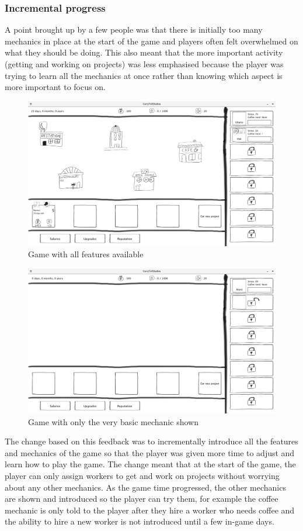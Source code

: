 \documentclass[11pt]{article}
\begin{document}
\subsubsection{Incremental progress}
A point brought up by a few people was that there is initially too many mechanics in place at the start of the game and players often felt overwhelmed on what they should be doing. This also meant that the more important activity (getting and working on projects) was less emphasised because the player was trying to learn all the mechanics at once rather than knowing which aspect is more important to focus on.
\begin{figure}[H]
\centering
\includegraphics[width=1\textwidth, keepaspectratio]{imgs/all-features.png}
\caption{Game with all features available}
\end{figure}

\begin{figure}[H]
\centering
\includegraphics[width=1\textwidth, keepaspectratio]{imgs/no-features.png}
\caption{Game with only the very basic mechanic shown}
\end{figure}
\noindent
The change based on this feedback was to incrementally introduce all the features and mechanics of the game so that the player was given more time to adjust and learn how to play the game. The change meant that at the start of the game, the player can only assign workers to get and work on projects without worrying about any other mechanics. As the game time progressed, the other mechanics are shown and introduced so the player can try them, for example the coffee mechanic is only told to the player after they hire a worker who needs coffee and the ability to hire a new worker is not introduced until a few in-game days. 
\end{document}
